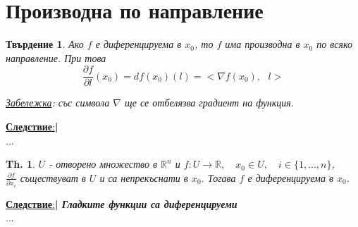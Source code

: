\documentclass[12pt]{article}
\newcommand{\halfbox}[1]{\underline{\textbf{#1}:}\textbf{\large{| }}}
\newtheorem{proposition}{Твърдение}
\newtheorem{theorem}{Th.}
\newcommand{\spc}{\text{ }}
\begin{document}
	\section*{Производна по направление}
	\begin{proposition}
		Ако $f$ е диференцируема в $x_0$, то $f$ има производна в $x_0$ по всяко направление. При това\\
		\[\frac{\partial f}{\partial l}(x_0)=df(x_0)(l)=<\nabla f(x_0),\spc l>\] 
		
		\underline{Забележка}: със символа $\nabla$ ще се отбелязва градиент на функция.
	\end{proposition}
	\halfbox{Следствие}\\
	...
	
	\begin{theorem}
		$U$ - отворено множество в $\mathbb{R}^n$ и $f:U\rightarrow \mathbb{R},\quad x_0\in U,\quad i\in\{1,...,n\}$,\\
		$\frac{\partial f}{\partial x_i}$ съществуват в $U$ и са непрекъснати в $x_0$. Тогава $f$ е диференцируема в $x_0$.
		
	\end{theorem}
	\halfbox{Следствие}\textbf{\textit{Гладките функции са диференцируеми}}\\
	...
\end{document}

